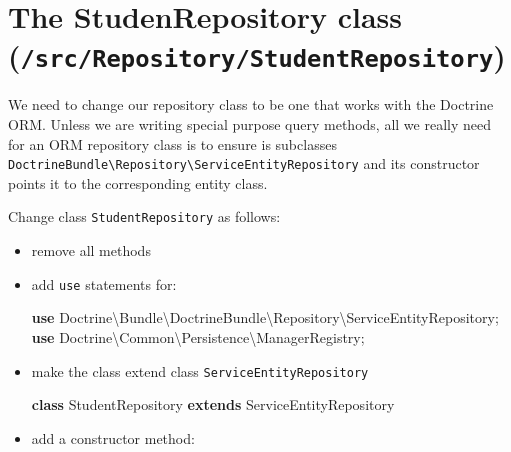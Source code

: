 \documentclass[a4paperpaper,openright]{book}
\newenvironment{Shaded}{}{}
\newcommand{\FunctionTok}[1]{\textcolor[rgb]{0.02,0.16,0.49}{#1}}
\newcommand{\KeywordTok}[1]{\textcolor[rgb]{0.00,0.44,0.13}{\textbf{#1}}}
\newcommand{\NormalTok}[1]{#1}
\newcommand{\OtherTok}[1]{\textcolor[rgb]{0.00,0.44,0.13}{#1}}
\begin{document}
\hypertarget{the-studenrepository-class-srcrepositorystudentrepository}{%
\section{\texorpdfstring{The StudenRepository class
(\texttt{/src/Repository/StudentRepository})}{The StudenRepository class (/src/Repository/StudentRepository)}}\label{the-studenrepository-class-srcrepositorystudentrepository}}

We need to change our repository class to be one that works with the
Doctrine ORM. Unless we are writing special purpose query methods, all
we really need for an ORM repository class is to ensure is subclasses
\texttt{DoctrineBundle\textbackslash{}Repository\textbackslash{}ServiceEntityRepository}
and its constructor points it to the corresponding entity class.

Change class \texttt{StudentRepository} as follows:

\begin{itemize}
\item
  remove all methods
\item
  add \texttt{use} statements for:

\begin{Shaded}
\begin{Highlighting}[]
    \KeywordTok{use}\NormalTok{ Doctrine\textbackslash{}Bundle\textbackslash{}DoctrineBundle\textbackslash{}Repository\textbackslash{}ServiceEntityRepository}\OtherTok{;}
    \KeywordTok{use}\NormalTok{ Doctrine\textbackslash{}Common\textbackslash{}Persistence\textbackslash{}ManagerRegistry}\OtherTok{;}      
\end{Highlighting}
\end{Shaded}
\item
  make the class extend class \texttt{ServiceEntityRepository}

\begin{Shaded}
\begin{Highlighting}[]
    \KeywordTok{class}\NormalTok{ StudentRepository }\KeywordTok{extends}\NormalTok{ ServiceEntityRepository}
\end{Highlighting}
\end{Shaded}
\item
  add a constructor method:

\begin{Shaded}
\end{Shaded}
\end{itemize}
\end{document}
